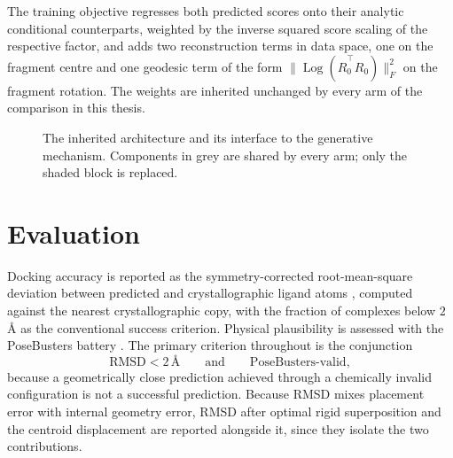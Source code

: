 \documentclass[11pt,a4paper]{report}
\theoremstyle{plain}
\theoremstyle{definition}
\theoremstyle{remark}
\newif\ifdraftmode
\newcommand{\figplaceholder}[3]{%
  \begin{figure}[htbp]
  \centering
  \ifdraftmode
    \begin{tcolorbox}[
      width=0.92\textwidth, colback=PanelGrey, colframe=DraftGrey,
      boxrule=0.5pt, sharp corners, halign=flush left]
      \small\sffamily
      \textbf{\color{DraftBlue}FIGURE PLACEHOLDER}\\[3pt]
      #3
    \end{tcolorbox}
  \else
    \fbox{\parbox{0.9\textwidth}{\centering\vspace{2cm}[figure]\vspace{2cm}}}
  \fi
  \caption{#2}
  \label{#1}
  \end{figure}}
\newcommand{\R}{\mathbb{R}}
\newcommand{\Log}{\operatorname{Log}}
\newcommand{\Rot}{R}
\begin{document}
The training objective regresses both predicted scores onto their analytic
conditional counterparts, weighted by the inverse squared score scaling of the
respective factor, and adds two reconstruction terms in data space, one on the
fragment centre and one geodesic term of the form
$\|\Log(\widehat{\Rot}_0^{\top}\Rot_0)\|_F^{2}$ on the fragment rotation. The
weights are inherited unchanged by every arm of the comparison in this thesis.

\figplaceholder{fig:architecture}
{The inherited architecture and its interface to the generative mechanism.
Components in grey are shared by every arm; only the shaded block is replaced.}
{Schematic in three columns.
\textbf{Left, shared:} protein pocket and ligand graph, featurisation,
EquiformerV2 backbone, per-atom steerable features.
\textbf{Middle, shared:} the $\ell=1$ output block emitting $f_i \in \R^3$
per atom, and the Newton-Euler reduction to $(F_F, \tau_F)$ per fragment,
Eq.~\eqref{eq:newton-euler}, with the mass and inertia step
Eq.~\eqref{eq:updates}. Draw the zeroth and first spatial moment explicitly,
so that the reader sees the two channels reading the same field differently.
\textbf{Right, replaced:} the interpretation layer. SigmaDock reads the
increments as a \emph{score}, rescales by $\lambda(t)$, and integrates a
reverse SDE; SigmaFlow reads them as a \emph{velocity} and integrates an ODE.
The figure must make visually obvious that the substitution is confined to one
block, since that is the evidence for the controlled comparison, and it
replaces roughly $400$ words of prose.}

\section{Evaluation}
\label{sec:metrics}

Docking accuracy is reported as the symmetry-corrected root-mean-square
deviation between predicted and crystallographic ligand atoms
\citep{meli2020spyrmsd}, computed against the nearest crystallographic copy,
with the fraction of complexes below $2$\,\AA{} as the conventional success
criterion. Physical plausibility is assessed with the PoseBusters battery
\citep{buttenschoen2024posebusters}. The primary criterion throughout is the
conjunction
\begin{equation}
  \mathrm{RMSD} < 2\,\text{\AA}
  \qquad\text{and}\qquad
  \text{PoseBusters-valid},
  \label{eq:success}
\end{equation}
because a geometrically close prediction achieved through a chemically invalid
configuration is not a successful prediction. Because RMSD mixes placement
error with internal geometry error, RMSD after optimal rigid superposition
\citep{kabsch1976solution} and the centroid displacement are reported
alongside it, since they isolate the two contributions.
\end{document}
